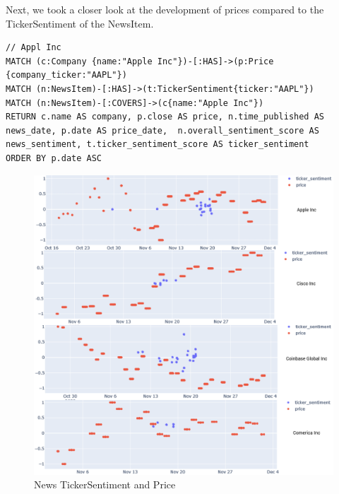 Next, we took a closer look at the development of prices compared to the TickerSentiment of the NewsItem.
\begin{lstlisting}[caption={Relationship of NewsItem TickerSentiment and Price of Apple Stock }, label={lst:newsItems_tickerSentiment_and_price_apple},captionpos=b]
// Appl Inc
MATCH (c:Company {name:"Apple Inc"})-[:HAS]->(p:Price {company_ticker:"AAPL"})
MATCH (n:NewsItem)-[:HAS]->(t:TickerSentiment{ticker:"AAPL"})
MATCH (n:NewsItem)-[:COVERS]->(c{name:"Apple Inc"})
RETURN c.name AS company, p.close AS price, n.time_published AS news_date, p.date AS price_date,  n.overall_sentiment_score AS news_sentiment, t.ticker_sentiment_score AS ticker_sentiment
ORDER BY p.date ASC
\end{lstlisting}

\begin{figure}[h]
 \centering
 \includegraphics[width=1.0\textwidth]{images/price_news_ticker_charts.png}
 \caption{News TickerSentiment and Price}
 \label{fig:price_news_sentiment}
\end{figure}


